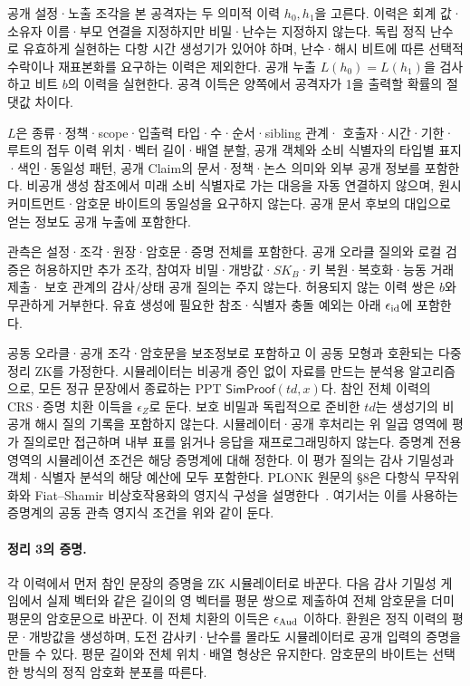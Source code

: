공개 설정·노출 조각을 본 공격자는 두 의미적 이력 $h_0,h_1$을 고른다.
이력은 회계 값·소유자 이름·부모 연결을 지정하지만 비밀·난수는
지정하지 않는다. 독립 정직 난수로 유효하게 실현하는 다항 시간
생성기가 있어야 하며, 난수·해시 비트에 따른 선택적 수락이나
재표본화를 요구하는 이력은 제외한다.
공개 누출 $L(h_0)=L(h_1)$을 검사하고 비트 $b$의 이력을 실현한다.
공격 이득은 양쪽에서 공격자가 1을 출력할 확률의 절댓값 차이다.

$L$은 종류·정책·scope·입출력 타입·수·순서·sibling 관계·
호출자·시간·기한·루트의 접두 이력 위치·벡터 길이·배열 분할,
공개 객체와 소비 식별자의 타입별 표지·색인·동일성 패턴,
공개 Claim의 문서·정책·논스 의미와 외부 공개 정보를 포함한다.
비공개 생성 참조에서 미래 소비 식별자로 가는 대응을 자동
연결하지 않으며, 원시 커미트먼트·암호문 바이트의 동일성을 요구하지 않는다.
공개 문서 후보의 대입으로 얻는 정보도 공개 누출에 포함한다.

관측은 설정·조각·원장·암호문·증명 전체를 포함한다.
공개 오라클 질의와 로컬 검증은 허용하지만 추가 조각,
참여자 비밀·개방값·$SK_B$·키 복원·복호화·능동 거래 제출·
보호 관계의 감사/상태 공개 질의는 주지 않는다.
허용되지 않는 이력 쌍은 $b$와 무관하게 거부한다.
유효 생성에 필요한 참조·식별자 충돌 예외는 아래 $\epsilon_{\rm id}$에 포함한다.

공동 오라클·공개 조각·암호문을 보조정보로 포함하고 이 공동 모형과 호환되는
다중 정리 ZK를 가정한다. 시뮬레이터는 비공개 증인 없이
자료를 만드는 분석용 알고리즘으로, 모든 정규 문장에서 종료하는
PPT $\mathsf{SimProof}(td,x)$다. 참인 전체 이력의 CRS·증명
치환 이득을 $\epsilon_Z$로 둔다.
보호 비밀과 독립적으로 준비한 $td$는 생성기의 비공개 해시 질의
기록을 포함하지 않는다. 시뮬레이터·공개 후처리는 위 일곱 영역에
평가 질의로만 접근하며 내부 표를 읽거나 응답을 재프로그래밍하지 않는다.
증명계 전용 영역의 시뮬레이션 조건은 해당 증명계에 대해 정한다.
이 평가 질의는 감사 기밀성과 객체·식별자 분석의 해당 예산에 모두 포함한다.
PLONK 원문의 \S8은 다항식 무작위화와 Fiat--Shamir
비상호작용화의 영지식 구성을 설명한다~\cite{gabizon-plonk-2019}.
여기서는 이를 사용하는 증명계의 공동 관측 영지식 조건을 위와 같이 둔다.

\paragraph{정리 3의 증명.}
각 이력에서 먼저 참인 문장의 증명을 ZK 시뮬레이터로 바꾼다.
다음 감사 기밀성 게임에서 실제 벡터와 같은 길이의 영 벡터를
평문 쌍으로 제출하여 전체 암호문을 더미 평문의 암호문으로 바꾼다.
이 전체 치환의 이득은 $\epsilon_{\rm Aud}$ 이하다.
환원은 정직 이력의 평문·개방값을 생성하며, 도전 감사키·난수를
몰라도 시뮬레이터로 공개 입력의 증명을 만들 수 있다.
평문 길이와 전체 위치·배열 형상은 유지한다.
암호문의 바이트는 선택한 방식의 정직 암호화 분포를 따른다.

